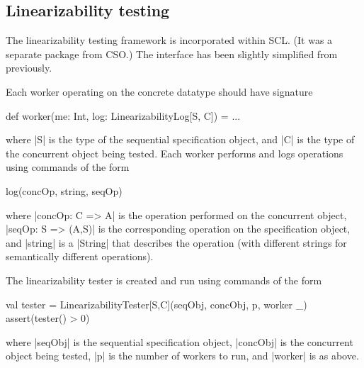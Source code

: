 \documentclass[11pt,a4paper]{article}
\begin{document}
\subsection*{Linearizability testing}

The linearizability testing framework is incorporated within SCL\@.  (It was a
separate package from CSO\@.)  The interface has been slightly simplified from
previously. 

Each worker operating on the concrete datatype should have signature 
%
\begin{scala}
  def worker(me: Int, log: LinearizabilityLog[S, C]) = ...
\end{scala}
%
where |S| is the type of the sequential specification object, and |C| is the
type of the concurrent object being tested.  Each worker performs and logs
operations using commands of the form
%
\begin{scala}
  log(concOp, string, seqOp)
\end{scala}
%
where |concOp: C => A| is the operation performed on the concurrent object,
|seqOp: S => (A,S)| is the corresponding operation on the specification
object, and |string| is a |String| that describes the operation (with
different strings for semantically different operations).

The linearizability tester is created and run using commands of the form
%
\begin{scala}
  val tester = LinearizabilityTester[S,C](seqObj, concObj, p, worker _)
  assert(tester() > 0)
\end{scala}
%
where |seqObj| is the sequential specification object, |concObj| is the
concurrent object being tested, |p| is the number of workers to run, and
|worker| is as above. 
\end{document}
